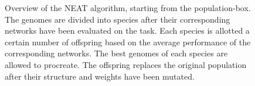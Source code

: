\begin{figure}[htb]
\begin{mdframed}
\begin{tikzpicture}
    \end{tikzpicture}
    \end{mdframed}
    \caption{Overview of the NEAT algorithm, starting from the population-box. The genomes are
    divided into species after their corresponding networks
    have been evaluated on the task. Each species is allotted a certain number of offspring based on
    the average performance of the corresponding networks. The best genomes of each species are allowed
    to procreate. The offspring replaces the original population after their structure and weights have been mutated.}
    \label{neat_overview}
\end{figure}